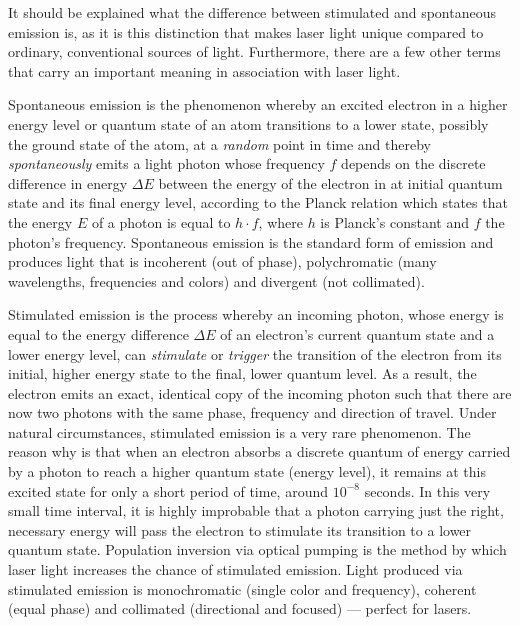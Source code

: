 
It should be explained what the difference between stimulated and spontaneous emission is, as it is this distinction that makes laser light unique compared to ordinary, conventional sources of light. Furthermore, there are a few other terms that carry an important meaning in association with laser light.

\begin{itemize}


	Spontaneous emission is the phenomenon whereby an excited electron in a higher energy level or quantum state of an atom transitions to a lower state, possibly the ground state of the atom, at a \emph{random} point in time and thereby \emph{spontaneously} emits a light photon whose frequency $f$ depends on the discrete difference in energy $\Delta E$ between the energy of the electron in at initial quantum state and its final energy level, according to the Planck relation which states that the energy $E$ of a photon is equal to $h \cdot f$, where $h$ is Planck's constant and $f$ the photon's frequency. Spontaneous emission is the standard form of emission and produces light that is incoherent (out of phase), polychromatic (many wavelengths, frequencies and colors) and divergent (not collimated).


	Stimulated emission is the process whereby an incoming photon, whose energy is equal to the energy difference $\Delta E$ of an electron's current quantum state and a lower energy level, can \emph{stimulate} or \emph{trigger} the transition of the electron from its initial, higher energy state to the final, lower quantum level. As a result, the electron emits an exact, identical copy of the incoming photon such that there are now two photons with the same phase, frequency and direction of travel. Under natural circumstances, stimulated emission is a very rare phenomenon. The reason why is that when an electron absorbs a discrete quantum of energy carried by a photon to reach a higher quantum state (energy level), it remains at this excited state for only a short period of time, around $10^{-8}$ seconds. In this very small time interval, it is highly improbable that a photon carrying just the right, necessary energy will pass the electron to stimulate its transition to a lower quantum state. Population inversion via optical pumping is the method by which laser light increases the chance of stimulated emission. Light produced via stimulated emission is monochromatic (single color and frequency), coherent (equal phase) and collimated (directional and focused) --- perfect for lasers.
	

\end{itemize}
